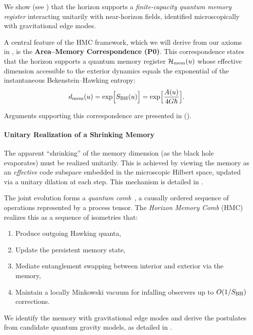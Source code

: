 \documentclass[a4paper,11pt]{article}
\newcommand{\HMC}{\textsc{HMC}\xspace}
\theoremstyle{plain}
\theoremstyle{definition}
\theoremstyle{remark}
\begin{document}
We show (see ) that the horizon supports a \emph{finite-capacity quantum memory register} interacting unitarily with near-horizon fields, identified microscopically with gravitational edge modes.

A central feature of the \HMC{} framework, which we will derive from our axioms in , is the \textbf{Area--Memory Correspondence (P0)}. This correspondence states that the horizon supports a quantum memory register $\mathcal{H}_{\rm mem}(u)$ whose effective dimension accessible to the exterior dynamics equals the exponential of the instantaneous Bekenstein--Hawking entropy:
\begin{equation}
    d_{\rm mem}(u)=\exp\!\Big[S_{\rm BH}(u)\Big] = \exp\!\Big[\frac{A(u)}{4G\hbar}\Big].
    \label{eq:mem-dim}
\end{equation}

Arguments supporting this correspondence are presented in  ().

\paragraph{Unitary Realization of a Shrinking Memory}
The apparent ``shrinking'' of the memory dimension (as the black hole evaporates) must be realized unitarily. This is achieved by viewing the memory as an \emph{effective} code subspace embedded in the microscopic Hilbert space, updated via a unitary dilation at each step. This mechanism is detailed in .

The joint evolution forms a \emph{quantum comb}~\cite{Chiribella:2009, Pollock:2018}, a causally ordered sequence of operations represented by a process tensor. The \emph{Horizon Memory Comb} (\HMC{}) realizes this as a sequence of isometries that:
\begin{enumerate}
    \item Produce outgoing Hawking quanta,
    \item Update the persistent memory state,
    \item Mediate entanglement swapping between interior and exterior via the memory,
    \item Maintain a locally Minkowski vacuum for infalling observers up to $O(1/S_{\rm BH})$ corrections.
\end{enumerate}
We identify the memory with gravitational edge modes and derive the postulates from candidate quantum gravity models, as detailed in .
\end{document}
